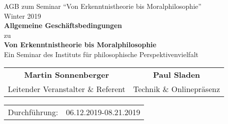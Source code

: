 \documentclass[a4paper, 12pt]{scrartcl}
\begin{document}
    \begin{titlepage}
        \begin{center}
            
	    \large {AGB zum Seminar \enquote{Von Erkenntnistheorie bis Moralphilosophie}} \\
            Winter 2019 \\
            \vspace{3cm}
            \textbf{ \Huge Allgemeine Gesch\"aftsbedingungen} \\
            \vspace{0.5cm}
            \large zu \\
            \vspace{1.5cm}
            \textbf{ \Large Von Erkenntnistheorie bis Moralphilosophie} \\
            \large Ein Seminar des Instituts f\"ur philosophische Perspektivenvielfalt

            \vspace{3cm}

            \begin{tabularx}{\textwidth}{CC}
            \textbf{Martin Sonnenberger} & \textbf{Paul Sladen} \\
            Leitender Veranstalter \& Referent & Technik \& Onlinepr\"asenz\\
            \end{tabularx}
           
            \vfill
            
            \begin{tabularx}{\textwidth}{XX}
                Durchführung: & 06.12.2019-08.21.2019
            \end{tabularx}
         \end{center}
    \end{titlepage}
\end{document}

